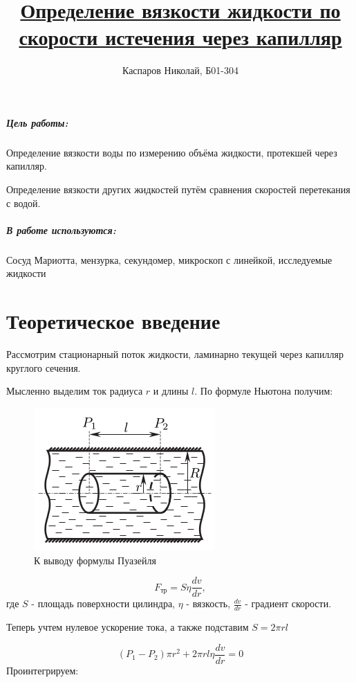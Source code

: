 \documentclass[a4paper]{article}
\title{\underline{Определение вязкости жидкости по скорости истечения через капилляр}}
\author{Каспаров Николай, Б01-304}
\begin{document}
\maketitle
\begin{center}
\Large{\textbf{ }}
\end{center}

\subparagraph{Цель работы:}

Определение вязкости воды по измерению объёма жидкости, протекшей через капилляр.

Определение вязкости других жидкостей путём сравнения скоростей перетекания с водой.

\subparagraph{В работе используются:}

Сосуд Мариотта, мензурка, секундомер, микроскоп с линейкой, исследуемые жидкости

\section{Теоретическое введение}

Рассмотрим стационарный поток жидкости, ламинарно текущей через капилляр круглого сечения.

Мысленно выделим ток радиуса $r$ и длины $l$. По формуле Ньютона получим:

\begin{figure}
    \centering
    \includegraphics[scale=0.75]{theory.png}
    \caption{К выводу формулы Пуазейля}
\end{figure}

\begin{equation}
    F_\text{тр} = S \eta \frac{dv}{dr},
\end{equation}
где $S$ - площадь поверхности цилиндра, $\eta$ - вязкость,
$\frac{dv}{dr}$ - градиент скорости.

Теперь учтем нулевое ускорение тока, а также подставим $S = 2 \pi rl$

\begin{equation}
    (P_1 - P_2)\pi r^2 + 2 \pi rl \eta \frac{dv}{dr} = 0
\end{equation}
Проинтегрируем:
\end{document}
